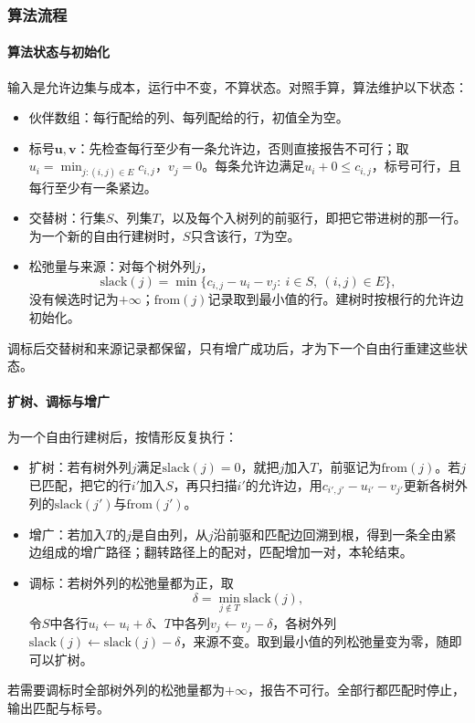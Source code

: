 \subsubsection{算法流程}

\paragraph{算法状态与初始化}
输入是允许边集与成本，运行中不变，不算状态。对照手算，算法维护以下状态：
\begin{itemize}
  \item 伙伴数组：每行配给的列、每列配给的行，初值全为空。
  \item 标号$\bm u,\bm v$：先检查每行至少有一条允许边，否则直接报告不可行；取$u_i=\min_{j:(i,j)\in E}c_{i,j}$，$v_j=0$。每条允许边满足$u_i+0\leq c_{i,j}$，标号可行，且每行至少有一条紧边。
  \item 交替树：行集$S$、列集$T$，以及每个入树列的前驱行，即把它带进树的那一行。为一个新的自由行建树时，$S$只含该行，$T$为空。
  \item 松弛量与来源：对每个树外列$j$，
  \[
    \mathrm{slack}(j)=\min\bigl\{c_{i,j}-u_i-v_j:\ i\in S,\ (i,j)\in E\bigr\},
  \]
  没有候选时记为$+\infty$；$\mathrm{from}(j)$记录取到最小值的行。建树时按根行的允许边初始化。
\end{itemize}
调标后交替树和来源记录都保留，只有增广成功后，才为下一个自由行重建这些状态。

\paragraph{扩树、调标与增广}
为一个自由行建树后，按情形反复执行：
\begin{itemize}
  \item 扩树：若有树外列$j$满足$\mathrm{slack}(j)=0$，就把$j$加入$T$，前驱记为$\mathrm{from}(j)$。若$j$已匹配，把它的行$i'$加入$S$，再只扫描$i'$的允许边，用$c_{i',j'}-u_{i'}-v_{j'}$更新各树外列的$\mathrm{slack}(j')$与$\mathrm{from}(j')$。
  \item 增广：若加入$T$的$j$是自由列，从$j$沿前驱和匹配边回溯到根，得到一条全由紧边组成的增广路径；翻转路径上的配对，匹配增加一对，本轮结束。
  \item 调标：若树外列的松弛量都为正，取
  \begin{equation}
    \delta=\min_{j\notin T}\mathrm{slack}(j),
    \label{eq:graph-opt-hungarian-delta}
  \end{equation}
  令$S$中各行$u_i\gets u_i+\delta$、$T$中各列$v_j\gets v_j-\delta$，各树外列$\mathrm{slack}(j)\gets\mathrm{slack}(j)-\delta$，来源不变。取到最小值的列松弛量变为零，随即可以扩树。
\end{itemize}
若需要调标时全部树外列的松弛量都为$+\infty$，报告不可行。全部行都匹配时停止，输出匹配与标号。

